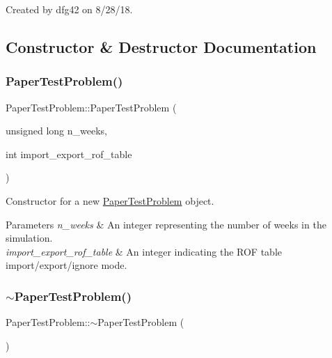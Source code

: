 Created by dfg42 on 8/28/18. 

\subsection{Constructor \& Destructor Documentation}
\mbox{\label{classPaperTestProblem_acc053a5b4515f3959494ce58c763d582}} 
\subsubsection{\texorpdfstring{Paper\+Test\+Problem()}{PaperTestProblem()}}
{\footnotesize\ttfamily Paper\+Test\+Problem\+::\+Paper\+Test\+Problem (\begin{DoxyParamCaption}\item[{unsigned long}]{n\+\_\+weeks,  }\item[{int}]{import\+\_\+export\+\_\+rof\+\_\+table }\end{DoxyParamCaption})}



Constructor for a new \mbox{\hyperlink{classPaperTestProblem}{Paper\+Test\+Problem}} object. 


\begin{DoxyParams}{Parameters}
{\em n\+\_\+weeks} & An integer representing the number of weeks in the simulation. \\
\hline
{\em import\+\_\+export\+\_\+rof\+\_\+table} & An integer indicating the R\+OF table import/export/ignore mode. \\
\hline
\end{DoxyParams}
\mbox{\label{classPaperTestProblem_a571a92266d4c58ebc27e20391f7ad81b}} 
\subsubsection{\texorpdfstring{$\sim$\+Paper\+Test\+Problem()}{~PaperTestProblem()}}
{\footnotesize\ttfamily Paper\+Test\+Problem\+::$\sim$\+Paper\+Test\+Problem (\begin{DoxyParamCaption}{ }\end{DoxyParamCaption})\hspace{0.3cm}{\ttfamily [override]}}



